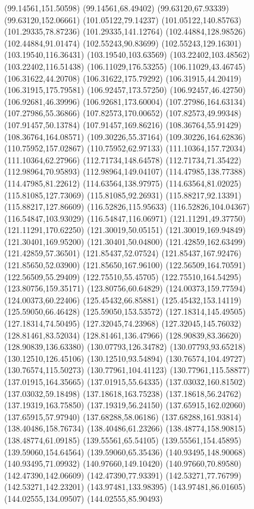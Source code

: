 {(99.14561,151.50598) (99.14561,68.49402) (99.63120,67.93339) (99.63120,152.06661) (101.05122,79.14237) (101.05122,140.85763) (101.29335,78.87236) (101.29335,141.12764)
(102.44884,128.98526) (102.44884,91.01474) (102.55243,90.83699) (102.55243,129.16301) (103.19540,116.36431) (103.19540,103.63569) (103.22402,103.48562) (103.22402,116.51438)
(106.11029,176.53255) (106.11029,43.46745) (106.31622,44.20708) (106.31622,175.79292) (106.31915,44.20419) (106.31915,175.79581) (106.92457,173.57250) (106.92457,46.42750)
(106.92681,46.39996) (106.92681,173.60004) (107.27986,164.63134) (107.27986,55.36866) (107.82573,170.00652) (107.82573,49.99348) (107.91457,50.13784) (107.91457,169.86216)
(108.36764,55.91429) (108.36764,164.08571) (109.30226,55.37164) (109.30226,164.62836) (110.75952,157.02867) (110.75952,62.97133) (111.10364,157.72034) (111.10364,62.27966)
(112.71734,148.64578) (112.71734,71.35422) (112.98964,70.95893) (112.98964,149.04107) (114.47985,138.77388) (114.47985,81.22612) (114.63564,138.97975) (114.63564,81.02025)
(115.81085,127.73069) (115.81085,92.26931) (115.88217,92.13391) (115.88217,127.86609) (116.52826,115.95633) (116.52826,104.04367) (116.54847,103.93029) (116.54847,116.06971)
(121.11291,49.37750) (121.11291,170.62250) (121.30019,50.05151) (121.30019,169.94849) (121.30401,169.95200) (121.30401,50.04800) (121.42859,162.63499) (121.42859,57.36501)
(121.85437,52.07524) (121.85437,167.92476) (121.85650,52.03900) (121.85650,167.96100) (122.56509,164.70591) (122.56509,55.29409) (122.75510,55.45705) (122.75510,164.54295)
(123.80756,159.35171) (123.80756,60.64829) (124.00373,159.77594) (124.00373,60.22406) (125.45432,66.85881) (125.45432,153.14119) (125.59050,66.46428) (125.59050,153.53572)
(127.18314,145.49505) (127.18314,74.50495) (127.32045,74.23968) (127.32045,145.76032) (128.81461,83.52034) (128.81461,136.47966) (128.90839,83.36620) (128.90839,136.63380)
(130.07793,126.34782) (130.07793,93.65218) (130.12510,126.45106) (130.12510,93.54894) (130.76574,104.49727) (130.76574,115.50273) (130.77961,104.41123) (130.77961,115.58877)
(137.01915,164.35665) (137.01915,55.64335) (137.03032,160.81502) (137.03032,59.18498) (137.18618,163.75238) (137.18618,56.24762) (137.19319,163.75850) (137.19319,56.24150)
(137.65915,162.02060) (137.65915,57.97940) (137.68288,58.06186) (137.68288,161.93814) (138.40486,158.76734) (138.40486,61.23266) (138.48774,158.90815) (138.48774,61.09185)
(139.55561,65.54105) (139.55561,154.45895) (139.59060,154.64564) (139.59060,65.35436) (140.93495,148.90068) (140.93495,71.09932) (140.97660,149.10420) (140.97660,70.89580)
(142.47390,142.06609) (142.47390,77.93391) (142.53271,77.76799) (142.53271,142.23201) (143.97481,133.98395) (143.97481,86.01605) (144.02555,134.09507) (144.02555,85.90493)
}
